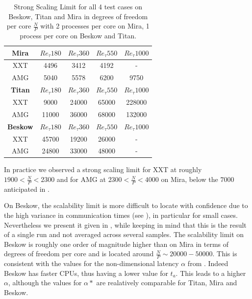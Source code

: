 \documentclass{sig-alternate}
\begin{document}
\begin{table}  
  \caption{Strong Scaling Limit for all 4 test cases on Beskow, Titan and Mira
  in degrees of freedom per core $\frac{N}{P}$ with 2 processes per core on Mira, 1 process per core on Beskow and Titan.}%
  \centering
  \begin{tabular}{c||cccc}
    \hline
    \hline
    {\bf Mira}
    &$Re_{\tau} 180$&$Re_{\tau} 360$&$Re_{\tau} 550$&$Re_{\tau} 1000$\\
    \hline
    XXT&4496&3412&4192&-\\
    AMG&5040&5578&6200&9750\\
    \hline
    \hline
    {\bf Titan}
    &$Re_{\tau} 180$&$Re_{\tau} 360$&$Re_{\tau} 550$&$Re_{\tau} 1000$\\
    \hline
    XXT&9000&24000&65000&228000\\
    AMG&11000&36000&68000&132000\\
    \hline
    \hline
    {\bf Beskow}
    &$Re_{\tau} 180$&$Re_{\tau} 360$&$Re_{\tau} 550$&$Re_{\tau} 1000$\\
    \hline
    XXT&45700&19200&26000& - \\
    AMG&24800&33000&48000& - \\
    \hline
    \hline
  \end{tabular}
  \label{tab:stronglimit}
\end{table}

% 

In practice we observed a strong scaling limit for XXT at roughly $1900<
\frac{N}{P} < 2300$ and for AMG at $2300<\frac{N}{P}<4000$ on Mira, below the $7000$
anticipated in \cite{fischer:scaling}. 

On Beskow, the scalability limit is more difficult to locate with confidence due 
to the high variance in communication times (see ), 
in particular for small cases. Nevertheless we present it given in 
, while keeping in mind that this is the result of a 
single run and not averaged across several samples. The scalability limit on 
Beskow is roughly one order of magnitude higher than on Mira in terms of degrees
of freedom per core and is located around $\frac{N}{P} \sim 20000 - 50000$. This 
is consistent with the values for the non-dimensional latency $\alpha$ 
from . Indeed Beskow has faster CPUs, thus having a
lower value for $t_a$. This leads to a higher $\alpha$, although the values for
$\alpha*$ are realatively comparable for Titan, Mira and Beskow. %
\end{document}
